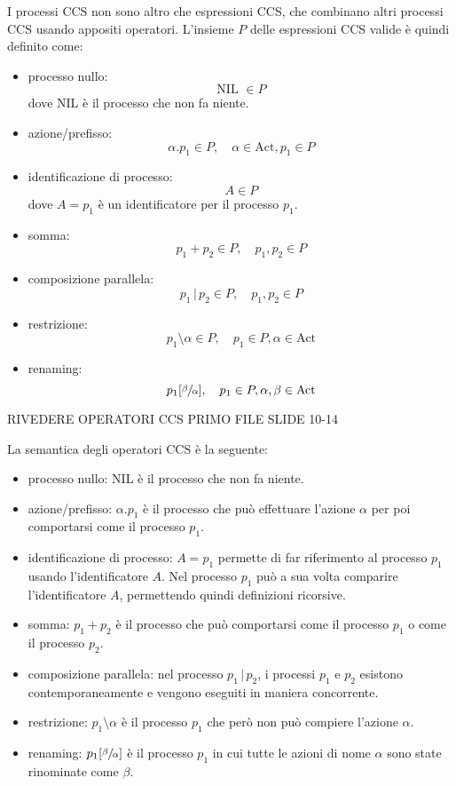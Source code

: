I processi CCS non sono altro che espressioni CCS, che combinano altri processi
CCS usando appositi operatori.
L'insieme $P$ delle espressioni CCS valide è quindi definito come:
\begin{itemize}
    \item processo nullo:
    \[
        \text{NIL } \in P
    \]
    dove NIL è il processo che non fa niente.
    \item azione/prefisso:
    \[
        \alpha.p_1 \in P, \quad \alpha \in \text{Act}, p_1 \in P
    \]
    \item identificazione di processo:
    \[
        A \in P
    \]
    dove $A = p_1$ è un identificatore per il processo $p_1$.
    \item somma:
    \[
        p_1 + p_2 \in P, \quad p_1, p_2 \in P
    \]
    \item composizione parallela:
    \[
        p_1 \,|\, p_2 \in P, \quad p_1, p_2 \in P
    \]
    \item restrizione:
    \[
        p_1 \setminus \alpha \in P, \quad p_1 \in P, \alpha \in \text{Act}
    \]
    \item renaming:
    \[
        p_1[\sfrac{\beta}{\alpha}], \quad p_1 \in P, \alpha, \beta \in \text{Act}
    \]
\end{itemize}
RIVEDERE OPERATORI CCS PRIMO FILE SLIDE 10-14

La semantica degli operatori CCS è la seguente:
\begin{itemize}
    \item processo nullo: NIL è il processo che non fa niente.
    \item azione/prefisso: $\alpha.p_1$ è il processo che può effettuare
    l'azione $\alpha$ per poi comportarsi come il processo $p_1$.
    \item identificazione di processo: $A = p_1$ permette di far riferimento
    al processo $p_1$ usando l'identificatore $A$. Nel processo $p_1$ può
    a sua volta comparire l'identificatore $A$, permettendo quindi definizioni
    ricorsive.
    \item somma: $p_1 + p_2$ è il processo che può comportarsi come il
    processo $p_1$ o come il processo $p_2$.
    \item composizione parallela: nel processo $p_1 \,|\, p_2$,
    i processi $p_1$ e $p_2$ esistono contemporaneamente e vengono eseguiti
    in maniera concorrente.
    \item restrizione: $p_1 \setminus \alpha$ è il processo $p_1$ che però
    non può compiere l'azione $\alpha$.
    \item renaming: $p_1[\sfrac{\beta}{\alpha}]$ è il processo $p_1$ in
    cui tutte le azioni di nome $\alpha$ sono state rinominate come $\beta$.
\end{itemize}

